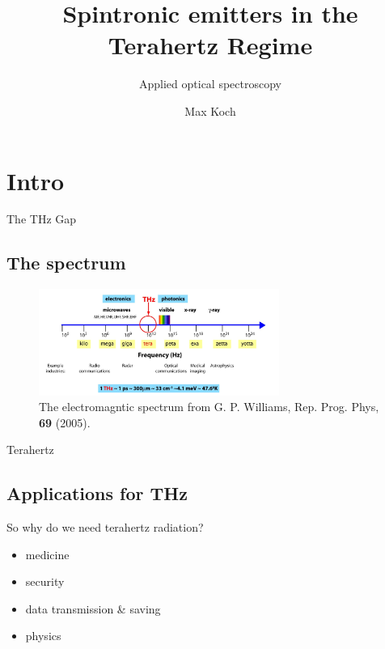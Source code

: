 \documentclass[aspectratio=1610, 9pt]{beamer}
\title{Spintronic emitters in the Terahertz Regime}
\subtitle{Applied optical spectroscopy}
\author[M.~Koch]{Max Koch}
\institute[]{TU Dortmund \\  Fakultät Physik}
\begin{document}
\maketitle

\section{Intro}

\begin{frame}{The THz Gap}
  \subsection{The spectrum}
  \begin{center}
    \begin{figure}
      \includegraphics[width=0.7\textwidth]{images/spectrum.png}
      \caption{\textcolor{tugreen}{The electromagntic spectrum} from G. P. Williams, Rep. Prog. Phys, \textbf{69} (2005)\nocite{spectrum_pic}.}
    \end{figure}
  \end{center}
\end{frame}


\begin{frame}{Terahertz}
  \subsection{Applications for THz}
  \begin{center}
    \begin{minipage}[c]{0.5\linewidth}
      So why do we need terahertz radiation?
      \vspace{0.2in}
      \begin{itemize}
        \item medicine \nocite{THzgap_applications}
        \vspace{0.1in}
        \item security \nocite{thz_explosive_detec}
        \vspace{0.1in}
        \item data transmission \& saving \nocite{communication,datasaving}
        \vspace{0.1in}
        \item physics \nocite{wiki_book}
      \end{itemize}
    \end{minipage}
\end{center}
\end{frame}
\end{document}
